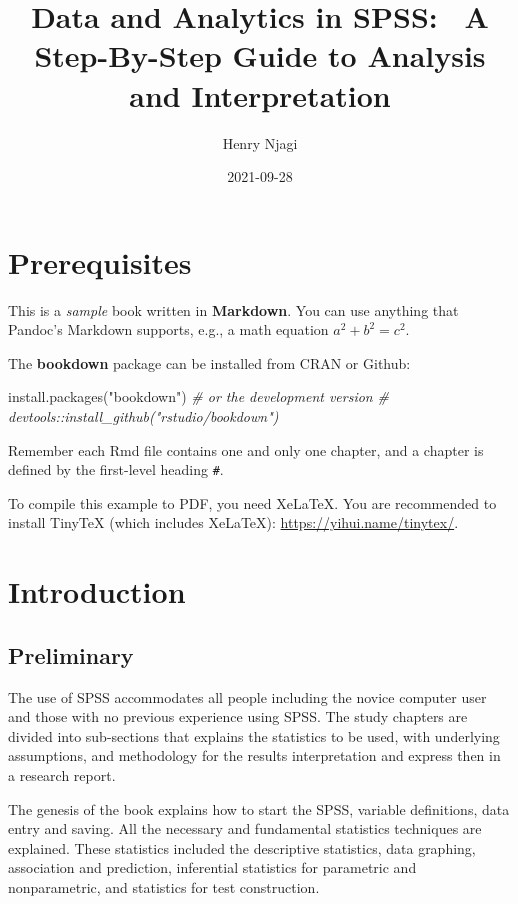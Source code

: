 \documentclass[
]{book}
\title{Data and Analytics in SPSS: ~A Step-By-Step Guide to Analysis and Interpretation}
\author{Henry Njagi}
\date{2021-09-28}
\newenvironment{Shaded}{\begin{snugshade}}{\end{snugshade}}
\newcommand{\CommentTok}[1]{\textcolor[rgb]{0.56,0.35,0.01}{\textit{#1}}}
\newcommand{\FunctionTok}[1]{\textcolor[rgb]{0.00,0.00,0.00}{#1}}
\newcommand{\NormalTok}[1]{#1}
\newcommand{\StringTok}[1]{\textcolor[rgb]{0.31,0.60,0.02}{#1}}
\begin{document}
\maketitle

{
\setcounter{tocdepth}{1}
\tableofcontents
}
\hypertarget{prerequisites}{%
\chapter{Prerequisites}\label{prerequisites}}

This is a \emph{sample} book written in \textbf{Markdown}. You can use anything that Pandoc's Markdown supports, e.g., a math equation \(a^2 + b^2 = c^2\).

The \textbf{bookdown} package can be installed from CRAN or Github:

\begin{Shaded}
\begin{Highlighting}[]
\FunctionTok{install.packages}\NormalTok{(}\StringTok{"bookdown"}\NormalTok{)}
\CommentTok{\# or the development version}
\CommentTok{\# devtools::install\_github("rstudio/bookdown")}
\end{Highlighting}
\end{Shaded}

Remember each Rmd file contains one and only one chapter, and a chapter is defined by the first-level heading \texttt{\#}.

To compile this example to PDF, you need XeLaTeX. You are recommended to install TinyTeX (which includes XeLaTeX): \url{https://yihui.name/tinytex/}.

\hypertarget{intro}{%
\chapter{Introduction}\label{intro}}

\hypertarget{preliminary}{%
\section{Preliminary}\label{preliminary}}

The use of SPSS accommodates all people including the novice computer user and those with no previous experience using SPSS. The study chapters are divided into sub-sections that explains the statistics to be used, with underlying assumptions, and methodology for the results interpretation and express then in a research report.

The genesis of the book explains how to start the SPSS, variable definitions, data entry and saving. All the necessary and fundamental statistics techniques are explained. These statistics included the descriptive statistics, data graphing, association and prediction, inferential statistics for parametric and nonparametric, and statistics for test construction.
\end{document}
